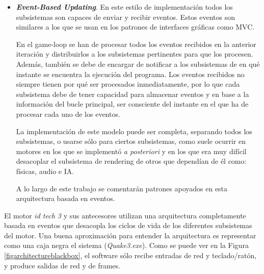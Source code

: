 \documentclass[a4paper,12pt]{report}
\begin{document}
\begin{itemize}
		\newpage
		
		\item \textit{\textbf{Event-Based Updating}}. En este estilo de implementación todos los subsistemas son capaces de enviar y recibir eventos. Estos eventos son similares a los que se usan en los patrones de interfaces gráficas como MVC. 
		
		En el game-loop se han de procesar todos los eventos recibidos en la anterior iteración y distribuirlos a los subsistemas pertinentes para que los procesen. Además, también se debe de encargar de notificar a los subsistemas de en qué instante se encuentra la ejecución del programa. Los eventos recibidos no siempre tienen por qué ser procesados inmediatamente, por lo que cada subsistema debe de tener capacidad para almacenar eventos y en base a la información del bucle principal, ser consciente del instante en el que ha de procesar cada uno de los eventos. 
		
		La implementación de este modelo puede ser completa, separando todos los subsistemas, o usarse sólo para ciertos subsistemas, como suele ocurrir en motores en los que se implementó \textit{a posteriori} y en los que era muy difícil desacoplar el subsistema de rendering de otros que dependían de él como: físicas, audio e IA. \cite{gameenginebook}
	
	    A lo largo de este trabajo se comentarán patrones apoyados en esta arquitectura basada en eventos.
		
	\end{itemize}	
	
	El motor \textit{id tech 3} y sus antecesores utilizan una arquitectura completamente basada en eventos que desacopla los ciclos de vida de los diferentes subsistemas del motor. Una buena aproximación para entender la arquitectura es representar como una caja negra el sistema (\textit{Quake3.exe}). Como se puede ver en la Figura \ref{figarchitectureblackbox}, el software sólo recibe entradas de red y teclado/ratón, y produce salidas de red y de frames.
	
\end{document}
